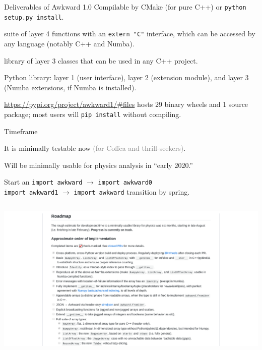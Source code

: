 \documentclass[aspectratio=169]{beamer}
\begin{document}
\begin{frame}{Deliverables of Awkward 1.0}
\large
\vspace{0.75 cm}
Compilable by CMake (for pure C++) or \texttt{python setup.py install}.

\vspace{0.5 cm}
\begin{description}\setlength{\itemsep}{0.5 cm}
\item[cpu-kernels.so] suite of layer 4 functions with an \texttt{extern "C"} interface, which can be accessed by any language (notably C++ and Numba).

\item[libawkward.so] library of layer 3 classes that can be used in any C++ project.

\item[\hspace{0.75 cm}awkward1] Python library: layer 1 (user interface), layer 2 (extension module), and layer 3 (Numba extensions, if Numba is installed).
\end{description}

\vspace{0.75 cm}
\textcolor{blue}{\normalsize \url{https://pypi.org/project/awkward1/\#files}} hosts 29 binary wheels and 1 source package; most users will \texttt{pip install} without compiling.
\end{frame}

\begin{frame}{Timeframe}
\Large
\begin{center}
It is minimally testable now \textcolor{gray}{(for Coffea and thrill-seekers)}.

\vspace{1 cm}
Will be minimally usable for physics analysis in ``early 2020.''

\vspace{1 cm}
\end{center}

Start an {\normalsize \texttt{import awkward}} $\to$ {\normalsize \texttt{import awkward0}} \\
\phantom{Start an} {\normalsize \texttt{import awkward1}} $\to$ {\normalsize \texttt{import awkward}} transition by spring.
\end{frame}

\begin{frame}{}
\vspace{-0.02 cm}
\begin{columns}
\includegraphics[width=\linewidth]{awkward-roadmap.png}
\end{columns}
\end{frame}
\end{document}
